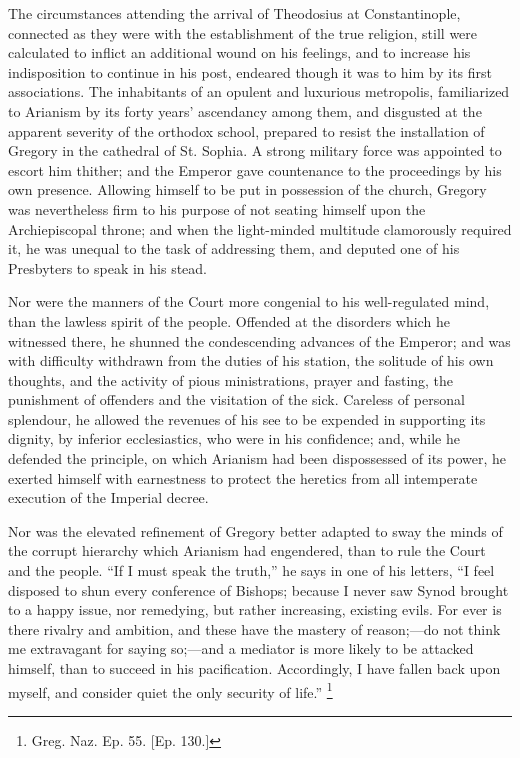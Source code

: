The circumstances attending the arrival of Theodosius at
Constantinople, connected as they were with the establishment of the
true religion, still were calculated to inflict an additional wound on
his feelings, and to increase his indisposition to continue in his
post, endeared though it was to him by its first associations. The
inhabitants of an opulent and luxurious metropolis, familiarized to
Arianism by its forty years' ascendancy among them, and disgusted at
the apparent severity of the orthodox school, prepared to resist the
installation of Gregory in the cathedral of St. Sophia. A strong
military force was appointed to escort him thither; and the Emperor
gave countenance to the proceedings by his own presence. Allowing
himself to be put in possession of the church, Gregory was
nevertheless firm to his purpose of not seating himself upon the
Archiepiscopal throne; and when the light-minded multitude clamorously
required it, he was unequal to the task of addressing them, and
deputed one of his Presbyters to speak in his stead.

Nor were the manners of the Court more congenial to his
well-regulated mind, than the lawless spirit of the people. Offended
at the disorders which he witnessed there, he shunned the
condescending advances of the Emperor; and was with difficulty
withdrawn from the duties of his station, the solitude of his own
thoughts, and the activity of pious ministrations, prayer and fasting,
the punishment of offenders and the visitation of the sick. Careless
of personal splendour, he allowed the revenues of his see to be
expended in supporting its dignity, by inferior ecclesiastics, who
were in his confidence; and, while he defended the principle, on which
Arianism had been dispossessed of its power, he exerted himself
with earnestness to protect the heretics from all intemperate
execution of the Imperial decree.

Nor was the elevated refinement of Gregory better adapted to sway
the minds of the corrupt hierarchy which Arianism had engendered, than
to rule the Court and the people. ``If I must speak the
truth,'' he says in one of his letters, ``I feel disposed to
shun every conference of Bishops; because I never saw Synod brought to
a happy issue, nor remedying, but rather increasing, existing evils.
For ever is there rivalry and ambition, and these have the mastery of
reason;—do not think me extravagant for saying so;—and a mediator
is more likely to be attacked himself, than to succeed in his
pacification. Accordingly, I have fallen back upon myself, and
consider quiet the only security of life.'' \footnote{Greg. Naz. Ep. 55. [Ep. 130.]}

